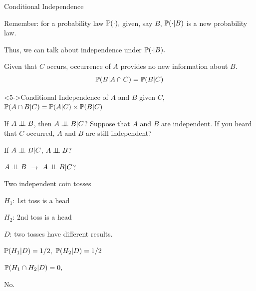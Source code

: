\documentclass[handout,fleqn,aspectratio=169]{beamer}
\begin{document}
\begin{frame}{Conditional Independence}

\plitemsep 0.07in
\bci 

\item<2-> Remember: for a probability law $\mathbb{P}( \cdot ),$ given, say $B$, $\mathbb{P}( \cdot | B )$ is a new probability law. 

\item<3-> Thus, we can talk about independence under $\mathbb{P}( \cdot | B ).$

\item<4-> Given that $C$ occurs, occurrence of $A$ provides no new information about $B.$
$$
\mathbb{P}( B | A \cap C ) = \mathbb{P}( B | C )
$$
\vspace{-0.2in}
\begin{block}<5->{Conditional Independence of $A$ and $B$ given $C$, }
$\mathbb{P}( A \cap B | C ) = \mathbb{P}( A |C ) \times \mathbb{P}( B |C )$
\end{block}

\smallskip
\item<7->  If $A \perp \!\!\! \perp B$,  then $A \perp \!\!\! \perp B | C$?
Suppose that $A$ and $B$ are independent. If you heard that $C$ occurred,  $A$ and $B$ are still independent?                                                         

\item<8->  If $A \perp \!\!\! \perp B | C$, $A \perp \!\!\! \perp B$?
\eci 
\end{frame}

\begin{frame}{$A \perp \!\!\! \perp B$ $\rightarrow$  $A \perp \!\!\! \perp B | C$?}

\plitemsep 0.2in
\bci 

\item<1-> Two independent coin tosses

\plitemsep 0.05in
\bci
\item $H_1$: 1st toss is a head
\item $H_2$: 2nd toss is a head
\item $D$: two tosses have different results.
\eci

\item<2-> $\mathbb{P}( H_1 | D ) = 1/2,$ $\mathbb{P}( H_2 | D ) = 1/2$  


\item<3-> $\mathbb{P}( H_1 \cap H_2 | D ) = 0,$  

\item<3-> No.
\eci 
\end{frame}
\end{document}

